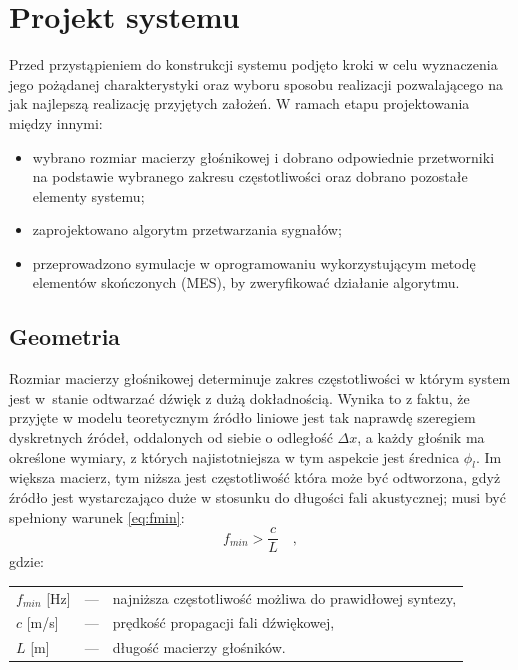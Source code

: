 \documentclass[10pt, a4paper]{article}
\let\Oldsection\section
\renewcommand{\section}{\FloatBarrier\Oldsection}
\let\Oldsubsection\subsection
\renewcommand{\subsection}{\FloatBarrier\Oldsubsection}
\begin{document}
\section{Projekt systemu}

Przed przystąpieniem do konstrukcji systemu podjęto kroki w celu wyznaczenia
jego pożądanej charakterystyki oraz wyboru sposobu realizacji pozwalającego na
jak najlepszą realizację przyjętych założeń. W ramach etapu projektowania
między innymi:
\begin{itemize}
  \item wybrano rozmiar macierzy głośnikowej i dobrano odpowiednie przetworniki
    na podstawie wybranego zakresu częstotliwości oraz dobrano pozostałe elementy systemu;
  \item zaprojektowano algorytm przetwarzania sygnałów;
  \item przeprowadzono symulacje w oprogramowaniu wykorzystującym metodę
    elementów skończonych (MES), by zweryfikować działanie algorytmu.
\end{itemize}

\subsection{Geometria}

Rozmiar macierzy głośnikowej determinuje zakres częstotliwości w którym system
jest w~stanie odtwarzać dźwięk z dużą dokładnością. Wynika to z faktu, że
przyjęte w modelu teoretycznym źródło liniowe jest tak naprawdę szeregiem
dyskretnych źródeł, oddalonych od siebie o odległość $\Delta x$, a każdy
głośnik ma określone wymiary, z których najistotniejsza w tym aspekcie jest
średnica $\phi_l$. Im większa macierz, tym niższa jest częstotliwość która może
być odtworzona, gdyż źródło jest wystarczająco duże w stosunku do długości fali
akustycznej; musi być spełniony warunek \eqref{eq:fmin}:
\begin{equation}
  f_{min}>\frac{c}{L} \quad,	\label{eq:fmin}
\end{equation}
gdzie:\\
\indent \begin{tabular}{l c l}
  $f_{min}$ [\si{\hertz}] & --- & najniższa częstotliwość możliwa do prawidłowej syntezy, \\
  $c$ [\si[per-mode=symbol]{\metre\per\second}] & --- & prędkość propagacji fali dźwiękowej, \\
  $L$ [\si{\metre}] & --- & długość macierzy głośników. \\
\end{tabular}\\
\end{document}

